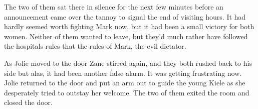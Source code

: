 The two of them sat there in silence for the next few minutes before an announcement came over the tannoy to signal the end of visiting hours.  It had hardly seemed worth fighting Mark now, but it had been a small victory for both women.  Neither of them wanted to leave, but they'd much rather have followed the hospitals rules that the rules of Mark, the evil dictator.  

As Jolie moved to the door Zane stirred again, and they both rushed back to his side but alas, it had been another false alarm.  It was getting frustrating now.  Jolie returned to the door and put an arm out to guide the young Kiele as she desperately tried to outstay her welcome.  The two of them exited the room and closed the door.



